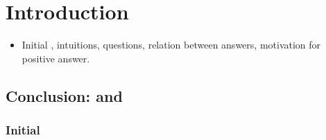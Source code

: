 \chapter{Introduction}
\label{cha:introduction}

\begin{note}
  \begin{itemize}
  \item
    Initial , intuitions, questions, relation between answers, motivation for positive answer.
  \end{itemize}
\end{note}

\section{Conclusion: \qWhy{} and \qHow{}}
\label{sec:overview:issue}

\subsection{Initial }

